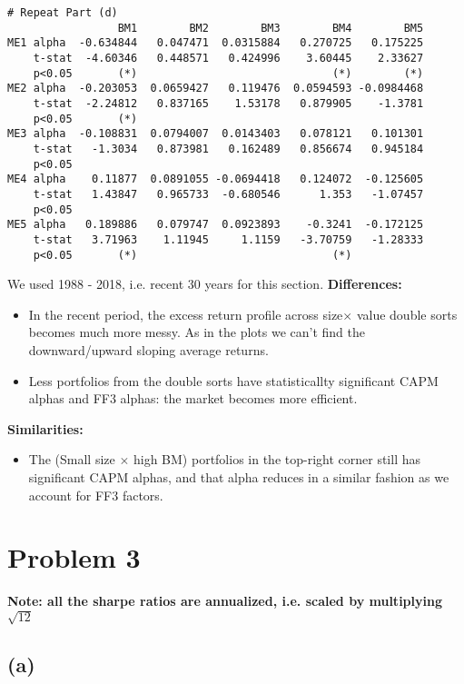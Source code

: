 \documentclass[10pt]{article}
\begin{document}
\begin{Verbatim}[commandchars=\\\{\}]
# Repeat Part (d)                                              
                 BM1        BM2        BM3        BM4        BM5
ME1 alpha  -0.634844   0.047471  0.0315884   0.270725   0.175225
    t-stat  -4.60346   0.448571   0.424996    3.60445    2.33627
    p<0.05       (*)                              (*)        (*)
ME2 alpha  -0.203053  0.0659427   0.119476  0.0594593 -0.0984468
    t-stat  -2.24812   0.837165    1.53178   0.879905    -1.3781
    p<0.05       (*)                                            
ME3 alpha  -0.108831  0.0794007  0.0143403   0.078121   0.101301
    t-stat   -1.3034   0.873981   0.162489   0.856674   0.945184
    p<0.05                                                      
ME4 alpha    0.11877  0.0891055 -0.0694418   0.124072  -0.125605
    t-stat   1.43847   0.965733  -0.680546      1.353   -1.07457
    p<0.05                                                      
ME5 alpha   0.189886   0.079747  0.0923893    -0.3241  -0.172125
    t-stat   3.71963    1.11945     1.1159   -3.70759   -1.28333
    p<0.05       (*)                              (*)           

    \end{Verbatim}
We used 1988 - 2018, i.e. recent 30 years for this section.
\textbf{Differences:}
\begin{itemize}
    \item In the recent period, the excess return profile across size$\times$ value double sorts becomes much more messy. As in the plots we can't find the downward/upward sloping average returns.
    \item Less portfolios from the double sorts have statisticallty significant CAPM alphas and FF3 alphas: the market becomes more efficient.
\end{itemize}
\textbf{Similarities:}
\begin{itemize}
    \item The (Small size $\times$ high BM) portfolios in the top-right corner still has significant CAPM alphas, and that alpha reduces in a similar fashion as we account for FF3 factors.
\end{itemize}

    
    \section{Problem 3}\label{problem-3}
    \textbf{Note: all the sharpe ratios are annualized, i.e. scaled by multiplying $\sqrt{12}$}

\subsection{(a)}\label{a}
\end{document}
